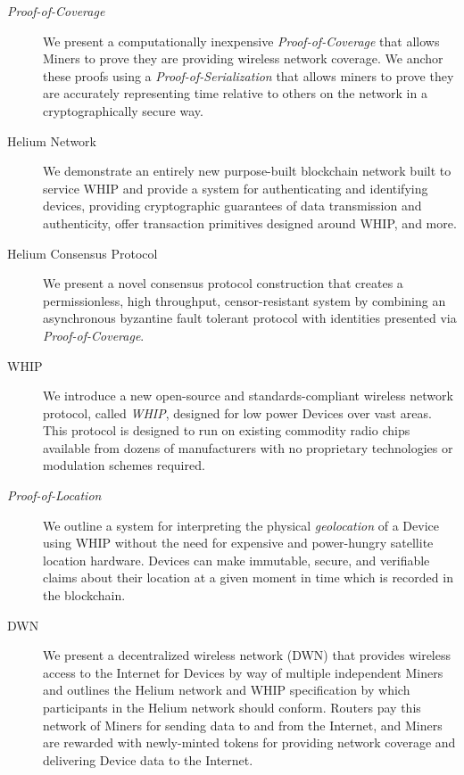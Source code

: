 \documentclass[10pt, nonatbib, nocopyrightspace, reprint]{sigplanconf}
\begin{document}
\begin{description}
  \item [\emph{Proof-of-Coverage}] We present a computationally inexpensive \emph{Proof-of-Coverage} that allows Miners to prove they are providing wireless network coverage. We anchor these proofs using a \emph{Proof-of-Serialization} that allows miners to prove they are accurately representing time relative to others on the network in a cryptographically secure way.

  \item [Helium Network] We demonstrate an entirely new purpose-built block\-chain network built to service WHIP and provide a system for authenticating and identifying devices, providing cryptographic guarantees of data transmission and authenticity, offer transaction primitives designed around WHIP, and more.

  \item [Helium Consensus Protocol] We present a novel consensus protocol construction that creates a permissionless, high throughput, censor-resistant system by combining an asynchronous byzantine fault tolerant protocol with identities presented via \emph{Proof-of-Coverage}.

  \item [WHIP] We introduce a new open-source and standards-compliant wireless network protocol, called \emph{WHIP}, designed for low power Devices over vast areas. This protocol is designed to run on existing commodity radio chips available from dozens of manufacturers with no proprietary technologies or modulation schemes required.

  \item [\emph{Proof-of-Location}] We outline a system for interpreting the physical \emph{geolocation} of a Device using WHIP without the need for expensive and power-hungry satellite location hardware. Devices can make immutable, secure, and verifiable claims about their location at a given moment in time which is recorded in the blockchain.

  \item [DWN] We present a decentralized wireless network (DWN) that provides wireless access to the Internet for Devices by way of multiple independent Miners and outlines the Helium network and WHIP specification by which participants in the Helium network should conform. Routers pay this network of Miners for sending data to and from the Internet, and Miners are rewarded with newly-minted tokens for providing network coverage and delivering Device data to the Internet.
\end{description}
\end{document}
